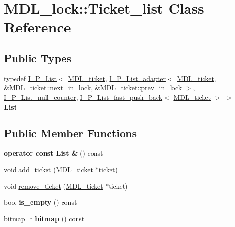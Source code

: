 \hypertarget{classMDL__lock_1_1Ticket__list}{}\section{M\+D\+L\+\_\+lock\+:\+:Ticket\+\_\+list Class Reference}
\label{classMDL__lock_1_1Ticket__list}
\subsection*{Public Types}
\begin{DoxyCompactItemize}
\item 
\mbox{\label{classMDL__lock_1_1Ticket__list_a1934e2705b66d67f9b2ee8c5777c5d79}} 
typedef \mbox{\hyperlink{classI__P__List}{I\+\_\+\+P\+\_\+\+List}}$<$ \mbox{\hyperlink{classMDL__ticket}{M\+D\+L\+\_\+ticket}}, \mbox{\hyperlink{structI__P__List__adapter}{I\+\_\+\+P\+\_\+\+List\+\_\+adapter}}$<$ \mbox{\hyperlink{classMDL__ticket}{M\+D\+L\+\_\+ticket}}, \&\mbox{\hyperlink{classMDL__ticket_ad9c009e5c097d2159dd142aa7f58e010}{M\+D\+L\+\_\+ticket\+::next\+\_\+in\+\_\+lock}}, \&M\+D\+L\+\_\+ticket\+::prev\+\_\+in\+\_\+lock $>$, \mbox{\hyperlink{classI__P__List__null__counter}{I\+\_\+\+P\+\_\+\+List\+\_\+null\+\_\+counter}}, \mbox{\hyperlink{classI__P__List__fast__push__back}{I\+\_\+\+P\+\_\+\+List\+\_\+fast\+\_\+push\+\_\+back}}$<$ \mbox{\hyperlink{classMDL__ticket}{M\+D\+L\+\_\+ticket}} $>$ $>$ {\bfseries List}
\end{DoxyCompactItemize}
\subsection*{Public Member Functions}
\begin{DoxyCompactItemize}
\item 
\mbox{\label{classMDL__lock_1_1Ticket__list_ab57e8ad1140231472dc0769322eeab95}} 
{\bfseries operator const List \&} () const
\item 
void \mbox{\hyperlink{classMDL__lock_1_1Ticket__list_ae1ec50de835e397d9c56b010fb894dfb}{add\+\_\+ticket}} (\mbox{\hyperlink{classMDL__ticket}{M\+D\+L\+\_\+ticket}} $\ast$ticket)
\item 
void \mbox{\hyperlink{classMDL__lock_1_1Ticket__list_ac6cdf2ddde468fcdf268b9d5a2a30200}{remove\+\_\+ticket}} (\mbox{\hyperlink{classMDL__ticket}{M\+D\+L\+\_\+ticket}} $\ast$ticket)
\item 
\mbox{\label{classMDL__lock_1_1Ticket__list_aa193b29a4ade2bc38315840bcb9b3f78}} 
bool {\bfseries is\+\_\+empty} () const
\item 
\mbox{\label{classMDL__lock_1_1Ticket__list_a41c93186d935ccac15123d474d48f315}} 
bitmap\+\_\+t {\bfseries bitmap} () const
\end{DoxyCompactItemize}


